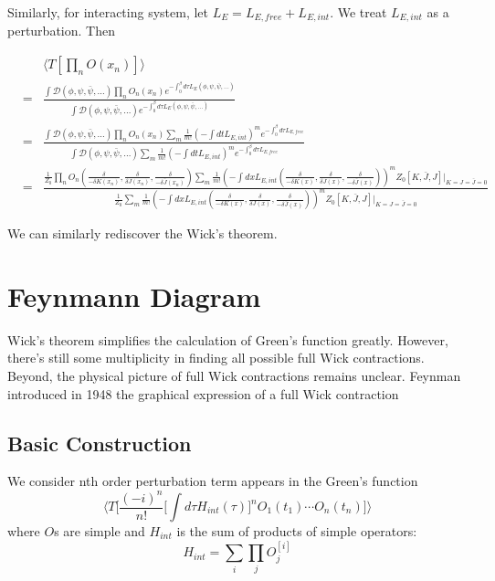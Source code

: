 \documentclass[12pt]{book}
\begin{document}
	
	Similarly, for interacting system, let $L_E=L_{E,free}+L_{E,int}$. We treat $L_{E,int}$ as a perturbation. Then
	
	\begin{eqnarray}
		&&\langle T[\prod_nO (x_n)]\rangle\\
		&=&\frac{\int \mathcal D(\phi,\psi,\bar\psi,\dots)\prod_n O_n(x_n)e^{-\int_0^\beta d\tau L_E(\phi,\psi,\bar\psi,\dots)}}{\int \mathcal D(\phi,\psi,\bar\psi,\dots)e^{-\int_0^\beta d\tau L_E(\phi,\psi,\bar\psi,\dots)}}\\
		&=&\frac {\int \mathcal D(\phi,\psi,\bar\psi,\dots)\prod_n O_n(x_n)\sum_m\frac 1{m!}(-\int dt L_{E,int})^me^{-\int_0^\beta d\tau L_{E,free}}}{\int \mathcal D(\phi,\psi,\bar\psi,\dots)\sum_m\frac 1{m!}(-\int dt L_{E,int})^me^{-\int_0^\beta d\tau L_{E,free}}}\\
		&=&\frac{\frac 1{Z_0}\prod_n O_n(\frac{\delta}{-\delta K(x_n)},\frac{\delta}{\delta J(x_n)},\frac{\delta}{-\delta \bar J(x_n)})\sum_m\frac 1{m!}(-\int dx L_{E,int}(\frac{\delta}{-\delta K(x)},\frac{\delta}{\delta J(x)},\frac{\delta}{-\delta \bar J(x)}))^mZ_0[K,\bar J,J]\Big|_{K=J=\bar J=0}}{\frac 1{Z_0}\sum_m\frac 1{m!}(-\int dx L_{E,int}(\frac{\delta}{-\delta K(x)},\frac{\delta}{\delta J(x)},\frac{\delta}{-\delta \bar J(x)}))^mZ_0[K,\bar J,J]\Big|_{K=J=\bar J=0}}
	\end{eqnarray}
	
	We can similarly rediscover the Wick's theorem.

	\chapter{Feynmann Diagram}
	
	Wick's theorem simplifies the calculation of Green's function greatly. However, there's still some multiplicity in finding all possible full Wick contractions. Beyond, the physical picture of full Wick contractions remains unclear. Feynman introduced in 1948 the graphical expression of a full Wick contraction 
	
	\section{Basic Construction}
	
	We consider nth order perturbation term appears in the Green's function
	\begin{equation}
		\Big \langle T\Big[ \frac{(-i)^n}{n!}\Big[\int d\tau H_{int}(\tau)\Big]^nO_1(t_1)\cdots O_n(t_n)\Big] \Big \rangle
	\end{equation} 
	where $O$s are simple and $H_{int}$ is the sum of products of simple operators:
	\begin{equation}
		H_{int}=\sum_i \prod_j O^{[i]}_j
	\end{equation}
	
\end{document}
